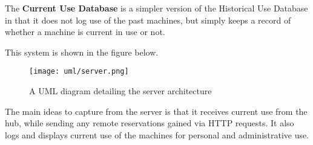 \documentclass[PPFS.tex]{template/subfiles}
\begin{document}
The \textbf{Current Use Database} is a simpler version of the Historical Use Database in that it does not log use of the past machines, but simply keeps a record of whether a machine is current in use or not.

This system is shown in the figure below.

\begin{figure}
    \centering
    \texttt{[image: uml/server.png]}
    \caption{A UML diagram detailing the server architecture}
\end{figure}

The main ideas to capture from the server is that it receives current use from the hub, while sending any remote reservations gained via HTTP requests. It also logs and displays current use of the machines for personal and administrative use.
\end{document}
